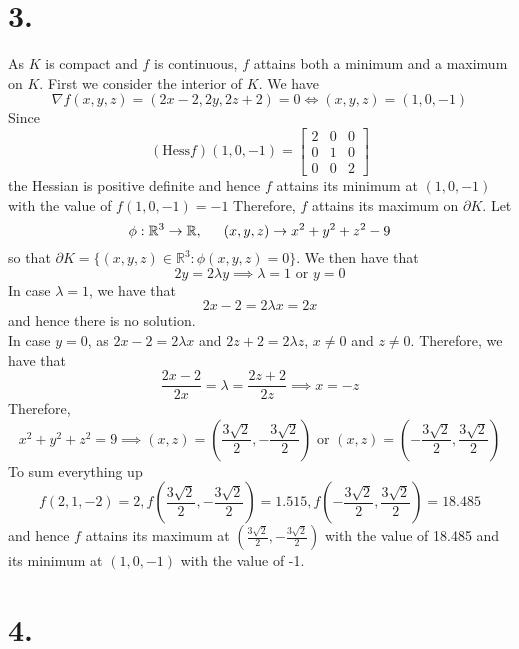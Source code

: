 \documentclass[11pt]{article}
\begin{document}
\section*{3.}
As $K$ is compact and $f$ is continuous, $f$ attains both a minimum and a maximum on $K$. First we consider the interior of $K$.
We have
\[
    \nabla f(x,y,z) = (2x-2,2y,2z+2) = 0 \iff (x,y,z) = (1,0,-1)
\]
Since 
\[
    (\text{Hess} f)(1,0,-1) = 
    \begin{bmatrix}
        2 & 0 & 0 \\
        0 & 1 & 0 \\
        0 & 0 & 2 
    \end{bmatrix}    
\]
the Hessian is positive definite and hence $f$ attains its minimum at $(1,0,-1)$ with the value of $f(1,0,-1) = -1$ Therefore, $f$ attains its maximum on 
$\partial K$. Let 
\[
    \phi: \mathbb{R}^3 \to \mathbb{R}, \indent (x,y,z) \to x^2 + y^2 + z^2 - 9    
\]
so that $\partial K = \{(x,y,z)\in \mathbb{R}^3: \phi(x,y,z) = 0\}$. We then have that 
\[
    2y = 2\lambda y \implies \lambda = 1 \text{ or } y=0
\]
In case $\lambda = 1$, we have that 
\[
    2x-2 = 2\lambda x = 2x  
\]
and hence there is no solution. \\
In case $y=0$, as $2x-2=2\lambda x$ and $2z+2 = 2\lambda z$, $x\ne 0$ and $z\ne 0$. Therefore, we have that
\[
    \frac{2x-2}{2x} = \lambda = \frac{2z+2}{2z} \implies x = -z    
\]
Therefore, 
\[
    x^2+y^2+z^2=9 \implies (x,z) = \left(\frac{3\sqrt{2}}{2},-\frac{3\sqrt{2}}{2}\right) \text{ or } (x,z) = \left(-\frac{3\sqrt{2}}{2},\frac{3\sqrt{2}}{2}\right)    
\]
To sum everything up 
\[
    f(2,1,-2) = 2, f\left(\frac{3\sqrt{2}}{2},-\frac{3\sqrt{2}}{2}\right) = 1.515, f\left(-\frac{3\sqrt{2}}{2},\frac{3\sqrt{2}}{2}\right) = 18.485 
\]
and hence $f$ attains its maximum at $\left(\frac{3\sqrt{2}}{2},-\frac{3\sqrt{2}}{2}\right)$ with the value of 18.485
and its minimum at $(1,0,-1)$ with the value of -1.
\pagebreak
\section*{4.}
\end{document}
